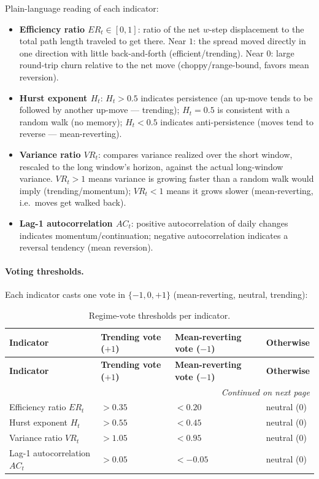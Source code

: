 Plain-language reading of each indicator:
\begin{itemize}
\item \textbf{Efficiency ratio $ER_t \in [0,1]$}: ratio of the net $w$-step displacement to
the total path length traveled to get there. Near $1$: the spread moved directly in one
direction with little back-and-forth (efficient/trending). Near $0$: large round-trip
churn relative to the net move (choppy/range-bound, favors mean reversion).
\item \textbf{Hurst exponent $H_t$}: $H_t>0.5$ indicates persistence (an up-move tends to
be followed by another up-move --- trending); $H_t=0.5$ is consistent with a random
walk (no memory); $H_t<0.5$ indicates anti-persistence (moves tend to reverse ---
mean-reverting).
\item \textbf{Variance ratio $VR_t$}: compares variance realized over the short window,
rescaled to the long window's horizon, against the actual long-window variance. $VR_t>1$
means variance is growing faster than a random walk would imply (trending/momentum);
$VR_t<1$ means it grows slower (mean-reverting, i.e.\ moves get walked back).
\item \textbf{Lag-1 autocorrelation $AC_t$}: positive autocorrelation of daily changes
indicates momentum/continuation; negative autocorrelation indicates a reversal
tendency (mean reversion).
\end{itemize}

\paragraph{Voting thresholds.} Each indicator casts one vote in $\{-1, 0, +1\}$
(mean-reverting, neutral, trending):

{\small
\setlength{\LTleft}{0pt}
\setlength{\LTright}{0pt}
\setlength{\tabcolsep}{5pt}
\renewcommand{\arraystretch}{1.15}
\begin{longtable}{p{} p{} p{} p{}}
\caption{Regime-vote thresholds per indicator.}\label{tab:pairs-regime-votes-overleaf} \\
\toprule
\textbf{Indicator} & \textbf{Trending vote ($+1$)} & \textbf{Mean-reverting vote ($-1$)} & \textbf{Otherwise} \\
\midrule
\endfirsthead
\toprule
\textbf{Indicator} & \textbf{Trending vote ($+1$)} & \textbf{Mean-reverting vote ($-1$)} & \textbf{Otherwise} \\
\midrule
\endhead
\midrule
\multicolumn{4}{r}{\textit{Continued on next page}} \\
\midrule
\endfoot
\bottomrule
\endlastfoot
Efficiency ratio $ER_t$ & $> 0.35$ & $< 0.20$ & neutral ($0$) \\
Hurst exponent $H_t$ & $> 0.55$ & $< 0.45$ & neutral ($0$) \\
Variance ratio $VR_t$ & $> 1.05$ & $< 0.95$ & neutral ($0$) \\
Lag-1 autocorrelation $AC_t$ & $> 0.05$ & $< -0.05$ & neutral ($0$) \\
\end{longtable}
}

